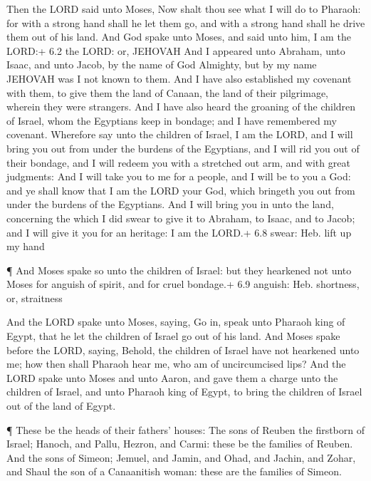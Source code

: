  Then the LORD said unto Moses, Now shalt thou see what I
will do to Pharaoh: for with a strong hand shall he let them go, and
with a strong hand shall he drive them out of his land.  And
God spake unto Moses, and said unto him, I am the LORD:+ 6.2 the LORD:
or, JEHOVAH  And I appeared unto Abraham, unto Isaac, and
unto Jacob, by the name of God Almighty, but by my name JEHOVAH was I
not known to them.  And I have also established my covenant
with them, to give them the land of Canaan, the land of their
pilgrimage, wherein they were strangers.  And I have also
heard the groaning of the children of Israel, whom the Egyptians keep in
bondage; and I have remembered my covenant.  Wherefore say
unto the children of Israel, I am the LORD, and I will bring you out
from under the burdens of the Egyptians, and I will rid you out of their
bondage, and I will redeem you with a stretched out arm, and with great
judgments:  And I will take you to me for a people, and I
will be to you a God: and ye shall know that I am the LORD your God,
which bringeth you out from under the burdens of the Egyptians.
 And I will bring you in unto the land, concerning the which
I did swear to give it to Abraham, to Isaac, and to Jacob; and I will
give it you for an heritage: I am the LORD.+ 6.8 swear: Heb. lift up my
hand

 ¶ And Moses spake so unto the children of Israel: but they
hearkened not unto Moses for anguish of spirit, and for cruel bondage.+
6.9 anguish: Heb. shortness, or, straitness

 And the LORD spake unto Moses, saying,  Go
in, speak unto Pharaoh king of Egypt, that he let the children of Israel
go out of his land.  And Moses spake before the LORD,
saying, Behold, the children of Israel have not hearkened unto me; how
then shall Pharaoh hear me, who am of uncircumcised lips? 
And the LORD spake unto Moses and unto Aaron, and gave them a charge
unto the children of Israel, and unto Pharaoh king of Egypt, to bring
the children of Israel out of the land of Egypt.

 ¶ These be the heads of their fathers' houses: The sons of
Reuben the firstborn of Israel; Hanoch, and Pallu, Hezron, and Carmi:
these be the families of Reuben.  And the sons of Simeon;
Jemuel, and Jamin, and Ohad, and Jachin, and Zohar, and Shaul the son of
a Canaanitish woman: these are the families of Simeon.

